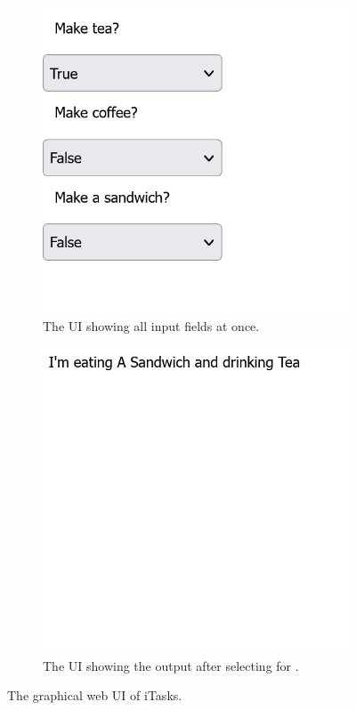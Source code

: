 \begin{figure}
\centering
\begin{subfigure}{0.45\textwidth}
    \centering
    \includegraphics[width=\textwidth]{img/screenshot-itasks-breakfast.png}
    \caption{The UI showing all input fields at once.}
    \label{fig:comparison_itask_ui_1}
\end{subfigure}
\hspace{0.05\textwidth}
\begin{subfigure}{0.45\textwidth}
    \centering
    \includegraphics[width=\textwidth]{img/screenshot-itasks-breakfast-view.png}
    \caption{The UI showing the output after selecting  for .}
    \label{fig:comparison_itask_ui_2}
\end{subfigure}
\caption{The graphical web UI of iTasks.}
\label{fig:comparison_itask_ui}
\end{figure}

